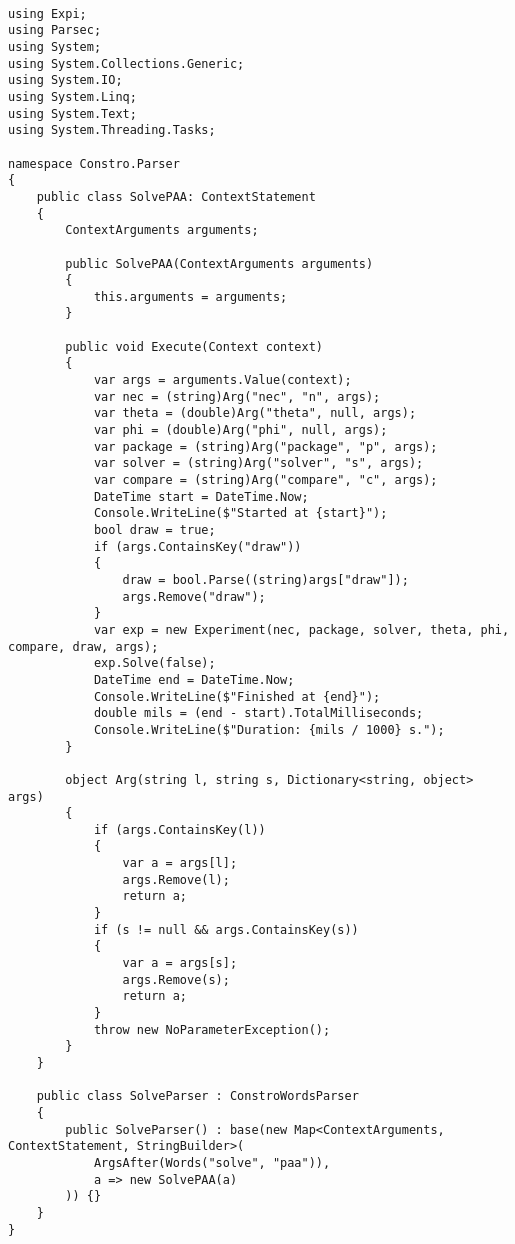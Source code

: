 \documentclass{scrartcl}
\begin{document}
\begin{lstlisting}[language={[Sharp]C}, caption={Solve}, label={experiment}]

using Expi;
using Parsec;
using System;
using System.Collections.Generic;
using System.IO;
using System.Linq;
using System.Text;
using System.Threading.Tasks;

namespace Constro.Parser
{
    public class SolvePAA: ContextStatement
    {
        ContextArguments arguments;

        public SolvePAA(ContextArguments arguments)
        {
            this.arguments = arguments;
        }

        public void Execute(Context context)
        {
            var args = arguments.Value(context);
            var nec = (string)Arg("nec", "n", args);
            var theta = (double)Arg("theta", null, args);
            var phi = (double)Arg("phi", null, args);
            var package = (string)Arg("package", "p", args);
            var solver = (string)Arg("solver", "s", args);
            var compare = (string)Arg("compare", "c", args);
            DateTime start = DateTime.Now;
            Console.WriteLine($"Started at {start}");
            bool draw = true;
            if (args.ContainsKey("draw"))
            {
                draw = bool.Parse((string)args["draw"]);
                args.Remove("draw");
            }
            var exp = new Experiment(nec, package, solver, theta, phi, compare, draw, args);
            exp.Solve(false);
            DateTime end = DateTime.Now;
            Console.WriteLine($"Finished at {end}");
            double mils = (end - start).TotalMilliseconds;
            Console.WriteLine($"Duration: {mils / 1000} s.");
        }

        object Arg(string l, string s, Dictionary<string, object> args)
        {
            if (args.ContainsKey(l))
            {
                var a = args[l];
                args.Remove(l);
                return a;
            }
            if (s != null && args.ContainsKey(s))
            {
                var a = args[s];
                args.Remove(s);
                return a;
            }
            throw new NoParameterException();
        }
    }

    public class SolveParser : ConstroWordsParser
    {
        public SolveParser() : base(new Map<ContextArguments, ContextStatement, StringBuilder>(
            ArgsAfter(Words("solve", "paa")),
            a => new SolvePAA(a)
        )) {}
    }
}


\end{lstlisting}
\end{document}
